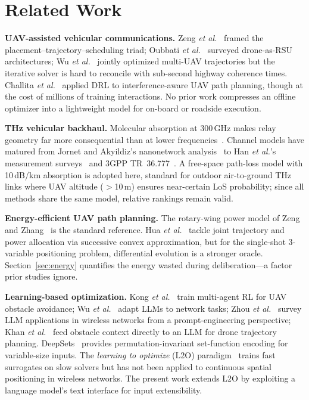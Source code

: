 \documentclass[journal]{IEEEtran}
\begin{document}
\section{Related Work}
\label{sec:related}

\textbf{UAV-assisted vehicular communications.}
Zeng \textit{et al.}~\cite{zeng2016wireless} framed the placement--trajectory--scheduling triad; Oubbati \textit{et al.}~\cite{oubbati2020} surveyed drone-as-RSU architectures; Wu \textit{et al.}~\cite{wu2018multi} jointly optimized multi-UAV trajectories but the iterative solver is hard to reconcile with sub-second highway coherence times. Challita \textit{et al.}~\cite{challita2019} applied DRL to interference-aware UAV path planning, though at the cost of millions of training interactions. No prior work compresses an offline optimizer into a lightweight model for on-board or roadside execution.

\textbf{THz vehicular backhaul.}
Molecular absorption at 300\,GHz makes relay geometry far more consequential than at lower frequencies~\cite{akyildiz2022, sarieddeen2021}. Channel models have matured from Jornet and Akyildiz's nanonetwork analysis~\cite{jornet2011} to Han \textit{et al.}'s measurement surveys~\cite{han2022} and 3GPP TR~36.777~\cite{3gpp36777}. A free-space path-loss model with 10\,dB/km absorption is adopted here, standard for outdoor air-to-ground THz links where UAV altitude ($>$10\,m) ensures near-certain LoS probability; since all methods share the same model, relative rankings remain valid.

\textbf{Energy-efficient UAV path planning.}
The rotary-wing power model of Zeng and Zhang~\cite{zeng2017energy} is the standard reference. Hua \textit{et al.}~\cite{hua2018} tackle joint trajectory and power allocation via successive convex approximation, but for the single-shot 3-variable positioning problem, differential evolution is a stronger oracle. Section~\ref{sec:energy} quantifies the energy wasted during deliberation---a factor prior studies ignore.

\textbf{Learning-based optimization.}
Kong \textit{et al.}~\cite{kong2023multi} train multi-agent RL for UAV obstacle avoidance; Wu \textit{et al.}~\cite{wu2024netllm} adapt LLMs to network tasks; Zhou \textit{et al.}~\cite{zhou2024llm} survey LLM applications in wireless networks from a prompt-engineering perspective; Khan \textit{et al.}~\cite{khan2025llmnav} feed obstacle context directly to an LLM for drone trajectory planning. DeepSets~\cite{zaheer2017deepsets} provides permutation-invariant set-function encoding for variable-size inputs. The \emph{learning to optimize} (L2O) paradigm~\cite{bengio2021} trains fast surrogates on slow solvers but has not been applied to continuous spatial positioning in wireless networks. The present work extends L2O by exploiting a language model's text interface for input extensibility.
\end{document}

